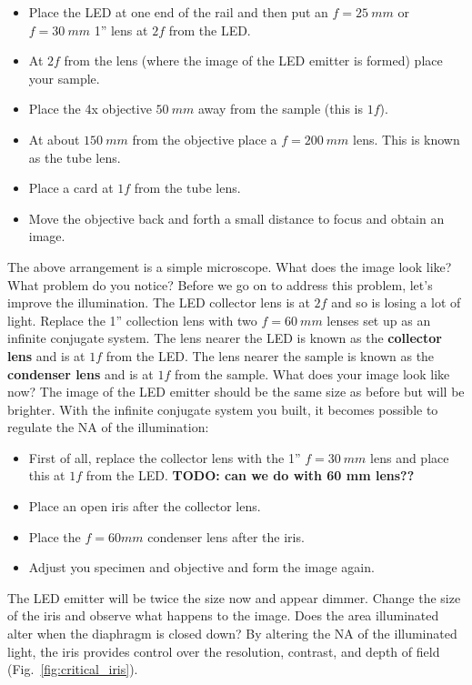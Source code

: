 \documentclass[a4paper]{report}
\begin{document}
\begin{itemize}
\item Place the LED at one end of the rail and then put an $f=25~mm$ or $f=30~mm$ 1'' lens at $2f$ from the LED. 
\item At $2f$ from the lens (where the image of the LED emitter is formed) place your sample.
\item Place the 4x objective $50~mm$ away from the sample (this is $1f$).
\item At about $150~mm$ from the objective place a $f=200~mm$ lens. This is known as the tube lens.
\item Place a card at $1f$ from the tube lens. 
\item Move the objective back and forth a small distance to focus and obtain an image. 
\end{itemize}

The above arrangement is a simple microscope. 
What does the image look like? 
What problem do you notice?
Before we go on to address this problem, let's improve the illumination. 
The LED collector lens is at $2f$ and so is losing a lot of light. 
Replace the 1'' collection lens with two $f=60~mm$ lenses set up as an infinite conjugate system.
The lens nearer the LED is known as the \textbf{collector lens} and is at $1f$ from the LED.
The lens nearer the sample is known as the \textbf{condenser lens} and is at $1f$ from the sample. 
What does your image look like now? 
The image of the LED emitter should be the same size as before but will be brighter. 
With the infinite conjugate system you built, it becomes possible to regulate the NA of the illumination:

\begin{itemize}
\item First of all, replace the collector lens with the 1'' $f=30~mm$ lens and place this at $1f$ from the LED. \textbf{TODO: can we do with 60 mm lens??}
\item Place an open iris after the collector lens.
\item Place the $f=60mm$ condenser lens after the iris. 
\item Adjust you specimen and objective and form the image again. 
\end{itemize}

The LED emitter will be twice the size now and appear dimmer. 
Change the size of the iris and observe what happens to the image. 
Does the area illuminated alter when the diaphragm is closed down?
By altering the NA of the illuminated light, the iris provides control over the resolution, contrast, and depth of field (Fig.~\ref{fig:critical_iris}).
\end{document}
